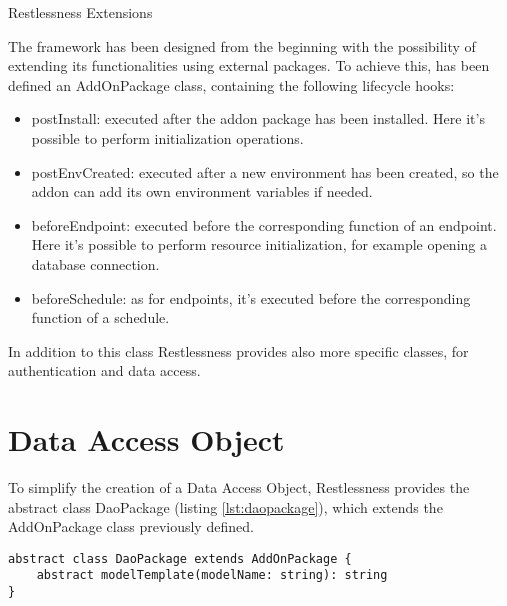 \begin{chapter}{Restlessness Extensions}
    \label{chap:extensions}

    The framework has been designed from the beginning with the possibility of
    extending its functionalities using external packages.
    To achieve this, has been defined an AddOnPackage class, containing the
    following lifecycle hooks:
    \begin{itemize}
        \item postInstall: executed after the addon package has been installed.
            Here it's possible to perform initialization operations.
        \item postEnvCreated: executed after a new environment has been created,
            so the addon can add its own environment variables if needed.
        \item beforeEndpoint: executed before the corresponding function of an
            endpoint. Here it's possible to perform resource initialization,
            for example opening a database connection.
        \item beforeSchedule: as for endpoints, it's executed before the
            corresponding function of a schedule.
    \end{itemize}

    In addition to this class Restlessness provides also more specific classes,
    for authentication and data access.



    \section{Data Access Object}
    \label{sec:data_access_object}

    To simplify the creation of a Data Access Object, Restlessness provides the
    abstract class DaoPackage (listing \ref{lst:daopackage}), which extends the
    AddOnPackage class previously defined.

    \begin{lstlisting}[caption=DaoPackage class definition, label={lst:daopackage}]
abstract class DaoPackage extends AddOnPackage {
    abstract modelTemplate(modelName: string): string
}
    \end{lstlisting}


\end{chapter}

